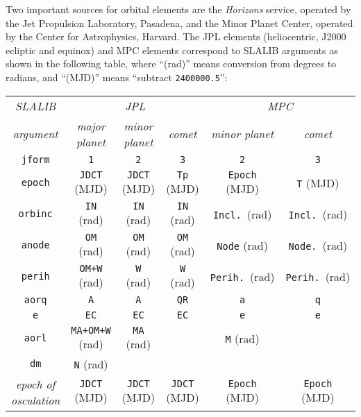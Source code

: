 \documentclass[11pt,fleqn,twoside]{article}
\renewcommand{\_}{{\tt\char'137}}     %
\begin{document}
Two important sources for orbital elements are the {\it Horizons}\/
service, operated by the Jet Propulsion Laboratory, Pasadena,
and the Minor Planet Center, operated by the Center for
Astrophysics, Harvard.
The JPL elements (heliocentric, J2000 ecliptic and
equinox) and MPC elements
correspond to SLALIB arguments as shown in the following table,
where ``(rad)'' means conversion from degrees to radians, and
``(MJD)'' means ``subtract {\tt 2400000.5}'':
 
\vspace{2ex}
 
\begin{small}
\begin{tabular}{|c||c|c|c||c|c|} \hline
{\it SLALIB } & \multicolumn{3}{c||}{\it JPL}
 & \multicolumn{2}{c|}{\it MPC} \\
{\it argument} & {\it major planet} & {\it minor planet} &
{\it comet} & {\it minor planet} & {\it comet} \\
\hline \hline
{\tt jform} & {\tt 1} & {\tt 2} & {\tt 3} & {\tt 2} & {\tt 3} \\
{\tt epoch} & {\tt JDCT} (MJD) & {\tt JDCT} (MJD) & {\tt Tp} (MJD) &
                                    {\tt Epoch} (MJD) & {\tt T} (MJD) \\
{\tt orbinc} & {\tt IN} (rad) & {\tt IN} (rad) & {\tt IN} (rad) &
                                {\tt Incl.}\ (rad) & {\tt Incl.}\ (rad) \\
{\tt anode} & {\tt OM} (rad) & {\tt OM} (rad) & {\tt OM} (rad) &
                                 {\tt Node} (rad) & {\tt Node.}\ (rad) \\
{\tt perih} & {\tt OM+W} (rad) & {\tt W} (rad) & {\tt W} (rad) &
                              {\tt Perih.}\ (rad) & {\tt Perih.}\ (rad) \\
{\tt aorq} & {\tt A} & {\tt A} & {\tt QR} & {\tt a} & {\tt q} \\
{\tt e} & {\tt EC} & {\tt EC} & {\tt EC} & {\tt e} & {\tt e} \\
{\tt aorl} & {\tt MA+OM+W} (rad) & {\tt MA} (rad) & & {\tt M} (rad) & \\
{\tt dm} & {\tt N} (rad) & & & & \\  \hline
{\it epoch of osculation} & {\tt JDCT} (MJD)
                          & {\tt JDCT} (MJD)
                          & {\tt JDCT} (MJD)
                          & {\tt Epoch} (MJD)
                          & {\tt Epoch} (MJD) \\
\hline
\end{tabular}
\end{small}\\[3ex]
 
\end{document}
